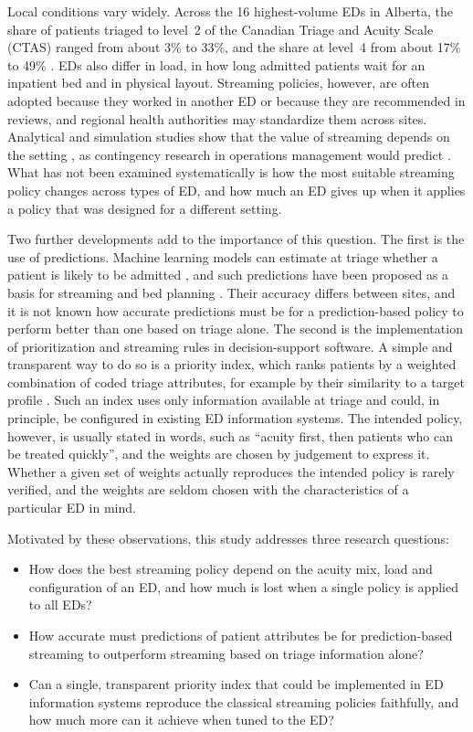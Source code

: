 Local conditions vary widely. Across the 16 highest-volume EDs in Alberta, the share of patients triaged to level~2 of the Canadian Triage and Acuity Scale (CTAS) ranged from about 3\% to 33\%, and the share at level~4 from about 17\% to 49\% \cite{Holroyd2016_EDCaseMix}. EDs also differ in load, in how long admitted patients wait for an inpatient bed and in physical layout. Streaming policies, however, are often adopted because they worked in another ED or because they are recommended in reviews, and regional health authorities may standardize them across sites. Analytical and simulation studies show that the value of streaming depends on the setting \cite{Saghafian2012_Streaming_as_a_Mechanism,Hu2009,laker2014flex_track}, as contingency research in operations management would predict \cite{Sousa2008_ContingencyOM}. What has not been examined systematically is how the most suitable streaming policy changes across types of ED, and how much an ED gives up when it applies a policy that was designed for a different setting.

Two further developments add to the importance of this question. The first is the use of predictions. Machine learning models can estimate at triage whether a patient is likely to be admitted \cite{SUN2011_disposition,Hong2018_disposition}, and such predictions have been proposed as a basis for streaming and bed planning \cite{Peck_2014_value_of_predictive_analytics,feizi2023vertical}. Their accuracy differs between sites, and it is not known how accurate predictions must be for a prediction-based policy to perform better than one based on triage alone. The second is the implementation of prioritization and streaming rules in decision-support software. A simple and transparent way to do so is a priority index, which ranks patients by a weighted combination of coded triage attributes, for example by their similarity to a target profile \cite{OFFODILE1990,GT-in-ED_HCMS2016}. Such an index uses only information available at triage and could, in principle, be configured in existing ED information systems. The intended policy, however, is usually stated in words, such as ``acuity first, then patients who can be treated quickly'', and the weights are chosen by judgement to express it. Whether a given set of weights actually reproduces the intended policy is rarely verified, and the weights are seldom chosen with the characteristics of a particular ED in mind.

Motivated by these observations, this study addresses three research questions:
\begin{itemize}
\item[RQ1:] How does the best streaming policy depend on the acuity mix, load and configuration of an ED, and how much is lost when a single policy is applied to all EDs?
\item[RQ2:] How accurate must predictions of patient attributes be for prediction-based streaming to outperform streaming based on triage information alone?
\item[RQ3:] Can a single, transparent priority index that could be implemented in ED information systems reproduce the classical streaming policies faithfully, and how much more can it achieve when tuned to the ED?
\end{itemize}

